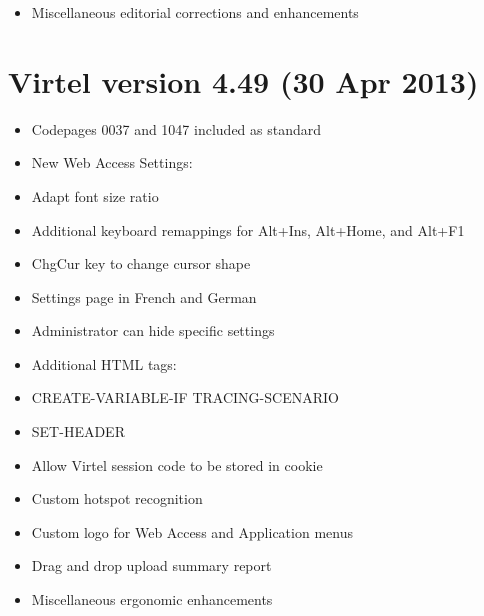 \documentclass[letterpaper,10pt,english]{sphinxmanual}
\begin{document}
\begin{itemize}
\item {} 
Miscellaneous editorial corrections and enhancements

\end{itemize}


\section{Virtel version 4.49 (30 Apr 2013)}
\label{\detokenize{Installation_Guide:virtel-version-4-49-30-apr-2013}}
\begin{itemize}
\item {} 
Codepages 0037 and 1047 included as standard

\item {} 
New Web Access Settings:

\item {} 
Adapt font size ratio

\item {} 
Additional keyboard remappings for Alt+Ins, Alt+Home, and Alt+F1

\item {} 
ChgCur key to change cursor shape

\item {} 
Settings page in French and German

\item {} 
Administrator can hide specific settings

\item {} 
Additional HTML tags:

\item {} 
CREATE-VARIABLE-IF TRACING-SCENARIO

\item {} 
SET-HEADER

\item {} 
Allow Virtel session code to be stored in cookie

\item {} 
Custom hotspot recognition

\item {} 
Custom logo for Web Access and Application menus

\item {} 
Drag and drop upload summary report

\item {} 
Miscellaneous ergonomic enhancements

\end{itemize}
\end{document}
